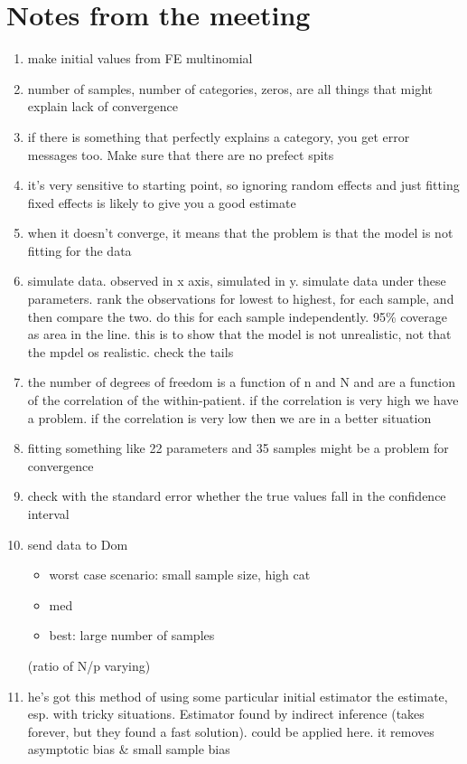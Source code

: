 \documentclass{article}
\begin{document}
\section{Notes from the meeting}
\begin{enumerate}
\item make initial values from FE multinomial
\item number of samples, number of categories, zeros, are all things that might explain lack of convergence
\item if there is something that perfectly explains a category, you get error messages too. Make sure that there are no prefect spits
\item it's very sensitive to starting point, so ignoring random effects and just fitting fixed effects is likely to give you a good estimate
\item when it doesn't converge, it means that the problem is that the model is not fitting for the data
\item simulate data. observed in x axis, simulated in y. simulate data under these parameters. rank the observations for lowest to highest, for each sample, and then compare the two. do this for each sample independently. 95\% coverage as area in the line. this is to show that the model is not unrealistic, not that the mpdel os realistic. check the tails
\item the number of degrees of freedom is a function of n and N and are a function of the correlation of the within-patient. if the correlation is very high we have a problem. if the correlation is very low then we are in a better situation
\item fitting something like 22 parameters and 35 samples might be a problem for convergence
\item check with the standard error whether the true values fall in the confidence interval
\item {\color{red} send data to Dom}
\begin{itemize}
	\item worst case scenario: small sample size, high cat
	\item med
	\item best: large number of samples
	\end{itemize}
	(ratio of N/p varying)
\item he's got this method of using some particular initial estimator the estimate, esp. with tricky situations. Estimator found by indirect inference (takes forever, but they found a fast solution). could be applied here. it removes asymptotic bias \& small sample bias

\end{enumerate}
\end{document}
